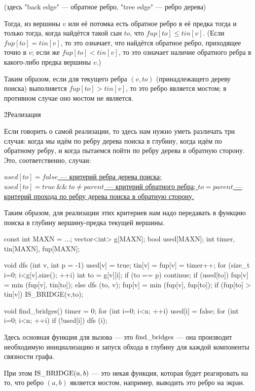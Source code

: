 (здесь "back edge" --- обратное ребро, "tree edge" --- ребро дерева)

Тогда, из вершины $v$ или её потомка есть обратное ребро в её предка тогда и только тогда, когда найдётся такой сын $to$, что $fup[to] \le tin[v]$. (Если $fup[to] = tin[v]$, то это означает, что найдётся обратное ребро, приходящее точно в $v$; если же $fup[to] < tin[v]$, то это означает наличие обратного ребра в какого-либо предка вершины $v$.)

Таким образом, если для текущего ребра $(v,to)$ (принадлежащего дереву поиска) выполняется $fup[to] > tin[v]$, то это ребро является мостом; в противном случае оно мостом не является.


\h2{Реализация}

Если говорить о самой реализации, то здесь нам нужно уметь различать три случая: когда мы идём по ребру дерева поиска в глубину, когда идём по обратному ребру, и когда пытаемся пойти по ребру дерева в обратную сторону. Это, соответственно, случаи:

\ul{
\li $used[to]=false$ --- критерий ребра дерева поиска;
\li $used[to]=true\ \&\&\ to \ne parent$ --- критерий обратного ребра;
\li $to=parent$ --- критерий прохода по ребру дерева поиска в обратную сторону.
}

Таким образом, для реализации этих критериев нам надо передавать в функцию поиска в глубину вершину-предка текущей вершины.

\code
const int MAXN = ...;
vector<int> g[MAXN];
bool used[MAXN];
int timer, tin[MAXN], fup[MAXN];

void dfs (int v, int p = -1) {
	used[v] = true;
	tin[v] = fup[v] = timer++;
	for (size_t i=0; i<g[v].size(); ++i) {
		int to = g[v][i];
		if (to == p)  continue;
		if (used[to])
			fup[v] = min (fup[v], tin[to]);
		else {
			dfs (to, v);
			fup[v] = min (fup[v], fup[to]);
			if (fup[to] > tin[v])
				IS_BRIDGE(v,to);
		}
	}
}

void find_bridges() {
	timer = 0;
	for (int i=0; i<n; ++i)
		used[i] = false;
	for (int i=0; i<n; ++i)
		if (!used[i])
			dfs (i);
}
\endcode

Здесь основная функция для вызова --- это ${\rm find\_bridges}$ --- она производит необходимую инициализацию и запуск обхода в глубину для каждой компоненты связности графа.

При этом ${\rm IS\_BRIDGE}(a,b)$ --- это некая функция, которая будет реагировать на то, что ребро $(a,b)$ является мостом, например, выводить это ребро на экран.

